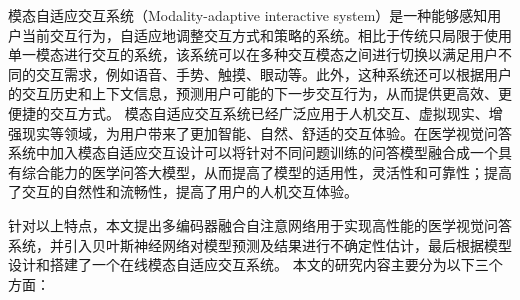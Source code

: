 模态自适应交互系统（Modality-adaptive interactive system）是一种能够感知用户当前交互行为，自适应地调整交互方式和策略的系统。相比于传统只局限于使用单一模态进行交互的系统，该系统可以在多种交互模态之间进行切换以满足用户不同的交互需求，例如语音、手势、触摸、眼动等。此外，这种系统还可以根据用户的交互历史和上下文信息，预测用户可能的下一步交互行为，从而提供更高效、更便捷的交互方式。
模态自适应交互系统已经广泛应用于人机交互、虚拟现实、增强现实等领域，为用户带来了更加智能、自然、舒适的交互体验。在医学视觉问答系统中加入模态自适应交互设计可以将针对不同问题训练的问答模型融合成一个具有综合能力的医学问答大模型，从而提高了模型的适用性，灵活性和可靠性；提高了交互的自然性和流畅性，提高了用户的人机交互体验。

针对以上特点，本文提出多编码器融合自注意网络用于实现高性能的医学视觉问答系统，并引入贝叶斯神经网络对模型预测及结果进行不确定性估计，最后根据模型设计和搭建了一个在线模态自适应交互系统。
本文的研究内容主要分为以下三个方面：
